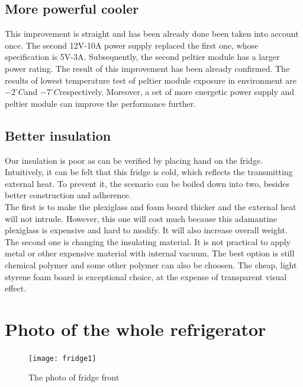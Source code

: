 \documentclass[12pt,onecolumn]{article}
\begin{document}
\subsection{More powerful cooler}
This improvement is straight and has been already done been taken into account once. The second 12V-10A power supply replaced the first one, whose specification is 5V-3A. Subsequently, the second peltier module has a larger power rating. The result of this improvement has been already confirmed. The results of lowest temperature test of peltier module exposure in environment are $-2^{\circ}C$and $-7^{\circ}C$respectively. Moreover, a set of more energetic power supply and peltier module can improve the performance further. 
\subsection{Better insulation}
Our insulation is poor as can be verified by placing hand on the fridge. Intuitively, it can be felt that this fridge is cold, which reflects the transmitting external heat. To prevent it, the scenario can be boiled down into two, besides better construction and adherence. \\
The first is to make the plexiglass and foam board thicker and the external heat will not intrude. However, this one will cost much because this adamantine plexiglass is expensive and hard to modify. It will also increase overall weight.\\
The second one is changing the insulating material. It is not practical to apply metal or other expensive material with internal vacuum. The best option is still chemical polymer and some other polymer can also be choosen. The cheap, light styrene foam board is exceptional choice, at the expense of transparent visual effect.  




\section{Photo of the whole refrigerator}
\begin{figure}[H]
	\centering
	\texttt{[image: fridge1]}
	\caption{The photo of fridge front}
\end{figure}
\end{document}
